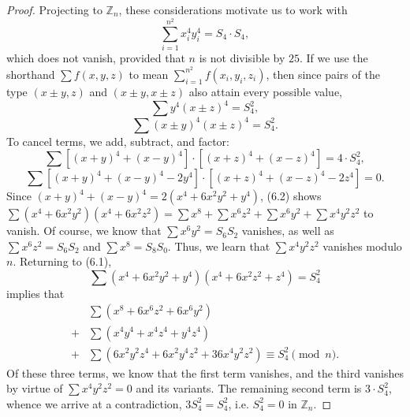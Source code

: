 \documentclass[10pt,a4paper]{amsart}
\begin{document}
\begin{proof}
Projecting to $\mathbb{Z}_n$, these considerations motivate us to work with
$$\sum_{i=1}^{n^2} x_i^4 y_i^4=S_4\cdot S_4,$$
which does not vanish, provided that $n$ is not divisible by $25$. If we use the shorthand $\sum f(x,y,z)$ to mean $\sum_{i=1}^{n^2} f(x_i,y_i,z_i)$, then since pairs of the type $(x\pm y,z)$ and $(x\pm y,x\pm z)$ also attain every possible value,
$$\sum y^4(x\pm z)^4=S_4^2,$$
$$\sum (x\pm y)^4(x\pm z)^4=S_4^2.$$
To cancel terms, we add, subtract, and factor:
\begin{equation}
\sum \left[(x+y)^4+(x-y)^4\right]\cdot \left[(x+z)^4+(x-z)^4\right]=4\cdot S_4^2,
\end{equation}
\begin{equation}
\sum \left[(x+y)^4+(x-y)^4-2y^4\right]\cdot \left[(x+z)^4+(x-z)^4-2z^4\right]= 0.
\end{equation}
Since $(x+y)^4+(x-y)^4=2(x^4+6x^2y^2+y^4)$, (6.2) shows $\sum (x^4+6x^2y^2)(x^4+6x^2z^2)=\sum x^8+\sum x^6z^2+\sum x^6y^2+\sum x^4y^2z^2$ to vanish. Of course, we know that $\sum x^6y^2=S_6S_2$ vanishes, as well as $\sum x^6z^2=S_6S_2$ and $\sum x^8=S_8S_0$. Thus, we learn that $\sum x^4y^2z^2$ vanishes modulo $n$. Returning to (6.1),
$$\sum (x^4+6x^2y^2+y^4)(x^4+6x^2z^2+z^4)=S_4^2$$
implies that
\begin{align*}
    & \sum (x^8+6x^6z^2+6x^6y^2) \\
    + &\sum (x^4y^4+x^4z^4+y^4z^4)\\
    + & \sum (6x^2y^2z^4+6x^2y^4z^2+36x^4y^2z^2)\equiv S_4^2 \pmod n.
\end{align*}
Of these three terms, we know that the first term vanishes, and the third vanishes by virtue of $\sum x^4y^2z^2=0$ and its variants. The remaining second term is $3\cdot S_4^2$, whence we arrive at a contradiction, $3S_4^2=S_4^2$, i.e. $S_4^2=0$ in $\mathbb{Z}_n$.
\end{proof}
\end{document}
